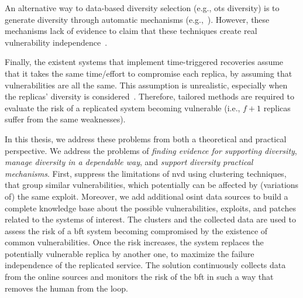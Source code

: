 An alternative way to data-based diversity selection (e.g., \gls{ots} diversity) is to generate diversity through automatic mechanisms (e.g.,~\cite{Roeder:2010,Amir:2011}).
However, these mechanisms lack of evidence to claim that these techniques create real vulnerability independence~\cite{Snow:2013,Bittau:2014}. 

Finally, the existent systems that implement time-triggered recoveries assume that it takes the same time/effort to compromise each replica, by assuming that vulnerabilities are all the same. 
This assumption is unrealistic, especially when the replicas' diversity is considered~\cite{Nayak:2014}. 
Therefore, tailored methods are required to evaluate the risk of a replicated system becoming vulnerable (i.e., $f+1$ replicas suffer from the same weaknesses).


In this thesis, we address these problems from both a theoretical and practical perspective.
We address the problems of \emph{finding evidence for supporting diversity}, \emph{manage diversity in a dependable way}, and \emph{support diversity practical mechanisms}.
First, suppress the limitations of \gls{nvd} using clustering techniques, that group similar vulnerabilities, which potentially can be affected by (variations of) the same exploit.
Moreover, we add additional \gls{osint} data sources to build a complete knowledge base about the possible vulnerabilities, exploits, and patches related to the systems of interest. 
The clusters and the collected data are used to assess the risk of a \gls{bft} system becoming compromised by the existence of common vulnerabilities.
Once the risk increases, the system replaces the potentially vulnerable replica by another one, to maximize the failure independence of the replicated service.
The solution continuously collects data from the online sources and monitors the risk of the \gls{bft} in such a way that removes the human from the loop.

